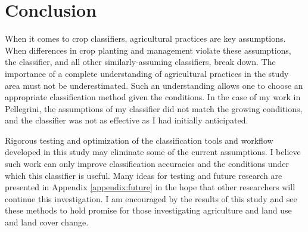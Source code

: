 \chapter{Conclusion}


When it comes to crop classifiers, agricultural practices are key assumptions. When differences in crop planting and management violate these assumptions, the classifier, and all other similarly-assuming classifiers, break down. The importance of a complete understanding of agricultural practices in the study area must not be underestimated. Such an understanding allows one to choose an appropriate classification method given the conditions. In the case of my work in Pellegrini, the assumptions of my classifier did not match the growing conditions, and the classifier was not as effective as I had initially anticipated.

Rigorous testing and optimization of the classification tools and workflow developed in this study may eliminate some of the current assumptions. I believe such work can only improve classification accuracies and the conditions under which this classifier is useful.  Many ideas for testing and future research are presented in Appendix \ref{appendix:future} in the hope that other researchers will continue this investigation. I am encouraged by the results of this study and see these methods to hold promise for those investigating agriculture and land use and land cover change.
